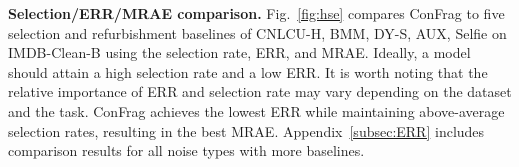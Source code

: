 \documentclass{article}
\theoremstyle{plain}
\theoremstyle{definition}
\theoremstyle{remark}
\begin{document}
\textbf{Selection/ERR/MRAE comparison.} 
Fig.~\ref{fig:hse} compares ConFrag to five selection and refurbishment baselines of CNLCU-H, BMM, DY-S, AUX, Selfie on IMDB-Clean-B using the selection rate, ERR, and MRAE.
Ideally, a model should attain a high selection rate and a low ERR.
It is worth noting that the relative importance of ERR and selection rate may vary depending on the dataset and the task. 
ConFrag achieves the lowest ERR while maintaining above-average selection rates, resulting in the best MRAE.
Appendix~\ref{subsec:ERR} includes comparison results for all noise types with more baselines.
\end{document}

